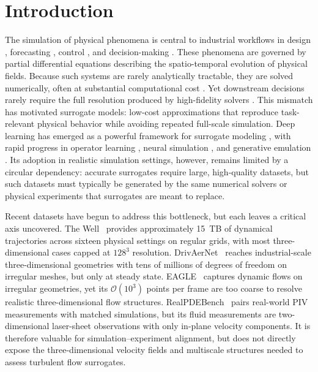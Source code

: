 \documentclass{article}
\begin{document}
\section{Introduction}
The simulation of physical phenomena is central to industrial workflows in design \citep{Allen2022}, forecasting \citep{Richardson1922WeatherPB}, control \citep{Brunton_Kutz_2022}, and decision-making \citep{GraphCast}. These phenomena are governed by partial differential equations describing the spatio-temporal evolution of physical fields. Because such systems are rarely analytically tractable, they are solved numerically, often at substantial computational cost \citep{ames2014numerical, Quarteroni2008NumericalAO}. Yet downstream decisions rarely require the full resolution produced by high-fidelity solvers \citep{airfrans2023, Zhiyin2015LES}. This mismatch has motivated surrogate models: low-cost approximations that reproduce task-relevant physical behavior while avoiding repeated full-scale simulation. Deep learning has emerged as a powerful framework for surrogate modeling \citep{Long2018, deBezenac2018}, with rapid progress in operator learning \citep{li2020fourier, Lu2019,serrano2024operator,Wu2024,Alkin2024}, neural simulation \citep{Brandstetter2022}, and generative emulation \citep{zebraserrano2024,Li2025DiT,enma}. Its adoption in realistic simulation settings, however, remains limited by a circular dependency: accurate surrogates require large, high-quality datasets, but such datasets must typically be generated by the same numerical solvers or physical experiments that surrogates are meant to replace.

Recent datasets have begun to address this bottleneck, but each leaves a critical axis uncovered. The Well~\citep{thewell2025} provides approximately 15~TB of dynamical trajectories across sixteen physical settings on regular grids, with most three-dimensional cases capped at $128^3$ resolution. DrivAerNet~\citep{drivaernet2025} reaches industrial-scale three-dimensional geometries with tens of millions of degrees of freedom on irregular meshes, but only at steady state. EAGLE~\citep{eagle2023} captures dynamic flows on irregular geometries, yet its $\mathcal{O}(10^3)$ points per frame are too coarse to resolve realistic three-dimensional flow structures. RealPDEBench~\citep{realpdebench2026} pairs real-world PIV measurements with matched simulations, but its fluid measurements are two-dimensional laser-sheet observations with only in-plane velocity components. It is therefore valuable for simulation--experiment alignment, but does not directly expose the three-dimensional velocity fields and multiscale structures needed to assess turbulent flow surrogates.
\end{document}
